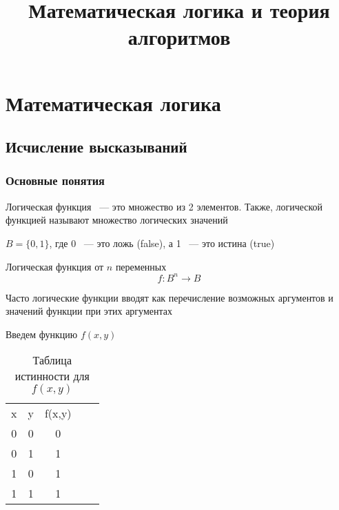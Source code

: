 \documentclass[russian]{lecture-notes}
\title{Математическая логика и теория алгоритмов}
\begin{document}
	\maketitle

\begin{sloppypar}

\tableofcontents

\section{Математическая логика}

\subsection{Исчисление высказываний}

\subsubsection{Основные понятия}

\begin{definition} 
	Логическая функция ~--- это множество из 2 элементов. Также, логической функцией называют множество логических значений
		
	$B = \{0, 1 \}$, где 0 ~--- это ложь (false), а 1 ~--- это истина (true)
\end{definition}

\begin{definition} 
	Логическая функция от $n$ переменных
	$$f : B^n \rightarrow B$$ 
\end{definition}

\begin{remark}
    Часто логические функции вводят как перечисление возможных аргументов и значений функции при этих аргументах
\end{remark}

\begin{example}
	Введем функцию $f(x,y)$
	
	\begin{table}[h!]
		\centering
		\begin{tabular}{|c|c|c|cl}
			\cline{1-3}
				x & y & f(x,y) & &  \\ \cline{1-3}
				0 & 0 & 0      &  &  \\ \cline{1-3}
				0 & 1 & 1      &  &  \\ \cline{1-3}
				1 & 0 & 1      &  &  \\ \cline{1-3}
				1 & 1 & 1      &  &  \\ \cline{1-3}
		\end{tabular}
		\caption{Таблица истинности для $f(x,y)$}
	\end{table}
	

\end{example}
\end{sloppypar}
\end{document}
